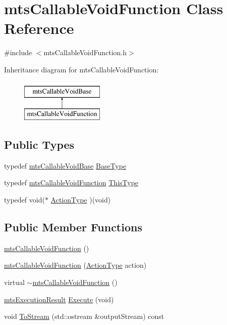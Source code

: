 \hypertarget{classmts_callable_void_function}{\section{mts\-Callable\-Void\-Function Class Reference}
\label{classmts_callable_void_function}
}


{\ttfamily \#include $<$mts\-Callable\-Void\-Function.\-h$>$}

Inheritance diagram for mts\-Callable\-Void\-Function\-:\begin{figure}[H]
\begin{center}
\leavevmode
\includegraphics[height=2.000000cm]{d2/d03/classmts_callable_void_function}
\end{center}
\end{figure}
\subsection*{Public Types}
\begin{DoxyCompactItemize}
\item 
typedef \hyperlink{classmts_callable_void_base}{mts\-Callable\-Void\-Base} \hyperlink{classmts_callable_void_function_a9a675710ec6f9f9e3bd9ed8b22755585}{Base\-Type}
\item 
typedef \hyperlink{classmts_callable_void_function}{mts\-Callable\-Void\-Function} \hyperlink{classmts_callable_void_function_a4885dc4c6ac40e229baca8146d328ae1}{This\-Type}
\item 
typedef void($\ast$ \hyperlink{classmts_callable_void_function_a2a31c549f68b956f3f2429cfee3f7c9f}{Action\-Type} )(void)
\end{DoxyCompactItemize}
\subsection*{Public Member Functions}
\begin{DoxyCompactItemize}
\item 
\hyperlink{classmts_callable_void_function_a81ec2fae6358fd930b74b1c697e33c4a}{mts\-Callable\-Void\-Function} ()
\item 
\hyperlink{classmts_callable_void_function_a31135fe8eaad23b834794201ca081d6a}{mts\-Callable\-Void\-Function} (\hyperlink{classmts_callable_void_function_a2a31c549f68b956f3f2429cfee3f7c9f}{Action\-Type} action)
\item 
virtual \hyperlink{classmts_callable_void_function_a6156a087323cf3dd618faf2a02abdcfd}{$\sim$mts\-Callable\-Void\-Function} ()
\item 
\hyperlink{classmts_execution_result}{mts\-Execution\-Result} \hyperlink{classmts_callable_void_function_a45faf2d05a2e89e5fc5e9cb0ec39fc98}{Execute} (void)
\item 
void \hyperlink{classmts_callable_void_function_adc5449fa0167851e7f2edd3c66943fa6}{To\-Stream} (std\-::ostream \&output\-Stream) const 
\end{DoxyCompactItemize}

